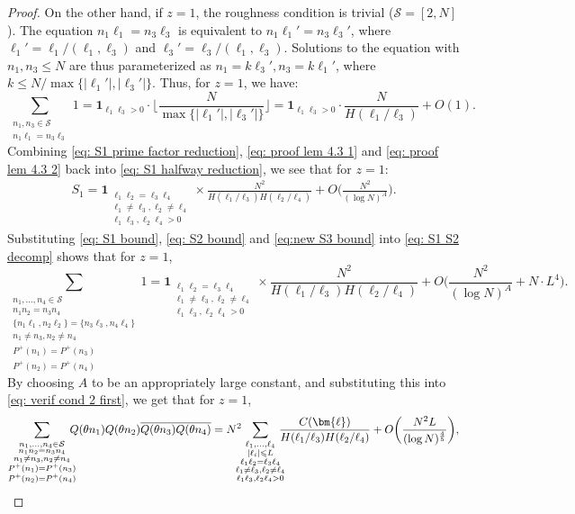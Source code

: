 \documentclass[12pt]{amsart}
\renewcommand{\leq}{\leqslant}
\numberwithin{equation}{section}
\theoremstyle{plain}
\theoremstyle{definition}
\renewcommand{\l}{\ell}
\newcommand{\CS}{\mathcal{S}}
\begin{document}
\begin{proof}
		On the other hand, if $z = 1$, the roughness condition is trivial ($\CS = [2,N]$). The equation $n_1\l_1 = n_3 \l_3$ is equivalent to $n_1 \l_1' = n_3 \l_3'$, where $\l_1' = \l_1/(\l_1,\l_3)$ and $\l_3' = \l_3/(\l_1,\l_3)$. Solutions to the equation with $n_1,n_3 \leq N$ are thus parameterized as $n_1 = k \l_3', n_3 = k\l_1'$, where $k \leq N/\max\{|\l_1'|,|\l_3'|\}.$ Thus, for $z=1$, we have:
		\begin{equation}\label{eq: proof lem 4.3 2}
			\sum_{\substack{n_1,n_3 \in \CS \\ n_1\l_1=n_3\l_3}} 1 = \bm{1}_{\l_1\l_3 > 0} \cdot \bigg\lfloor \frac{N}{\max\{|\l_1'|,|\l_3'|\}} \bigg\rfloor = \bm{1}_{\l_1\l_3 > 0}  \cdot \frac{N}{H(\l_1/\l_3)} + O(1).
		\end{equation}
		Combining \eqref{eq: S1 prime factor reduction}, \eqref{eq: proof lem 4.3 1} and \eqref{eq: proof lem 4.3 2} back into \eqref{eq: S1 halfway reduction}, we see that for $z=1$:
		\begin{align}\label{eq: S1 bound}
			S_1 = \bm{1}_{\substack{\l_1\l_2=\l_3\l_4 \\ \l_1 \ne \l_3, \l_2 \ne \l_4\\ \l_1\l_3,\l_2\l_4 > 0}} \times \frac{N^2}{H(\l_1/\l_3)H(\l_2/\l_4)} + O\bigg(\frac{N^2}{(\log N)^A}\bigg).
		\end{align}
		Substituting \eqref{eq: S1 bound}, \eqref{eq: S2 bound} and \eqref{eq:new S3 bound} into \eqref{eq: S1 S2 decomp} shows that for $z=1$,
		$$\sum_{\substack{n_1,\dots,n_4 \in \CS \\ n_1n_2=n_3n_4 \\ \{n_1\l_1,n_2\l_2\}=\{n_3\l_3,n_4\l_4\} \\ n_1 \ne n_3,n_2 \ne n_4 \\ P^+(n_1)=P^+(n_3) \\ P^+(n_2) = P^+(n_4)}} 1  = \bm{1}_{\substack{\l_1\l_2=\l_3\l_4 \\ \l_1 \ne \l_3, \l_2 \ne \l_4\\ \l_1\l_3,\l_2\l_4 > 0}} \times \frac{N^2}{H(\l_1/\l_3)H(\l_2/\l_4)} + O\bigg(\frac{N^2}{(\log N)^A} + N \cdot L^4\bigg).$$
		By choosing $A$ to be an appropriately large constant, and substituting this into \eqref{eq: verif cond 2 first}, we get that for $z=1$,
		\begin{equation}\label{eq: verif cond 2 before last}
			\sum_{\substack{n_1,\dots,n_4 \in \CS \\ n_1n_2=n_3n_4 \\ n_1 \ne n_3,n_2 \ne n_4 \\ P^+(n_1)=P^+(n_3) \\ P^+(n_2) = P^+(n_4)}} \hspace{-0.25cm} Q(\theta n_1)Q(\theta n_2)\overline{Q(\theta n_3)Q(\theta n_4)}= N^2 \hspace{-0.25cm} \sum_{\substack{\l_1,\dots,\l_4 \\ |\l_i| \leq L \\ \l_1\l_2=\l_3\l_4 \\ \l_1 \ne \l_3, \l_2 \ne \l_4\\ \l_1\l_3,\l_2\l_4 > 0}}\hspace{-0.25cm}\frac{ C(\bm{\l})}{H(\l_1/\l_3)H(\l_2/\l_4)} + O\bigg(\frac{N^2 L}{(\log N)^{\frac{4}{5}}}\bigg),

\end{equation}
\end{proof}
\end{document}
